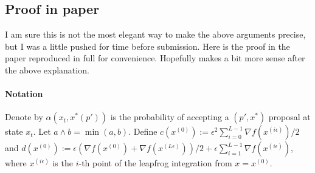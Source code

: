 \documentclass{article}
\begin{document}
\subsection{Proof in paper}

I am sure this is not the most elegant way to make the above arguments precise, but I was a little pushed for time before submission.  Here is the proof in the paper reproduced in full for convenience.  Hopefully makes a bit more sense after the above explanation.

\paragraph{Notation}

Denote by $\alpha(x_{t},x^{*}(p'))$ is the probability of accepting
a $(p',x^{*})$ proposal at state $x_{t}$. Let $a\wedge b=\min(a,b)$.
Define $c(x^{(0)}):=\epsilon^{2}\sum_{i=0}^{L-1}\nabla f(x^{(i\epsilon)})/2$
and $d(x^{(0)}):=\epsilon(\nabla f(x^{(0)})+\nabla f(x^{(L\epsilon)}))/2+\epsilon\sum_{i=1}^{L-1}\nabla f(x^{(i\epsilon)})$,
where $x^{(i\epsilon)}$ is the $i$-th point of the leapfrog integration
from $x=x^{(0)}$.
\end{document}
